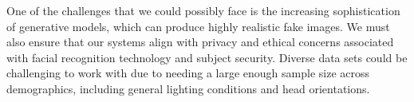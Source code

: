 \documentclass{article}
\begin{document}
\begin{titlepage}
\begin{itemize}
            One of the challenges that we could possibly face is the increasing sophistication of generative models, which can produce highly realistic fake images. We must also ensure that our systems align with privacy and ethical concerns associated with facial recognition technology and subject security. Diverse data sets could be challenging to work with due to needing a large enough sample size across demographics, including general lighting conditions and head orientations.

        \end{itemize}

	\pagebreak

\end{titlepage}
\end{document}

